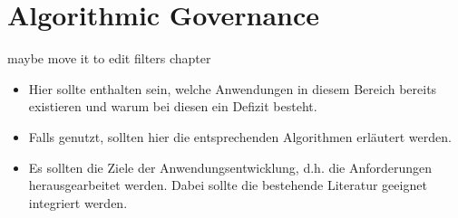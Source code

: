
\section{Algorithmic Governance}

maybe move it to edit filters chapter

\begin{itemize}
    \item Hier sollte enthalten sein, welche Anwendungen in diesem Bereich bereits existieren und warum bei diesen ein Defizit besteht.
    \item Falls genutzt, sollten hier die entsprechenden Algorithmen erläutert werden.
    \item Es sollten die Ziele der Anwendungsentwicklung, d.h. die Anforderungen herausgearbeitet werden. Dabei sollte die bestehende Literatur geeignet integriert werden.
\end{itemize}
